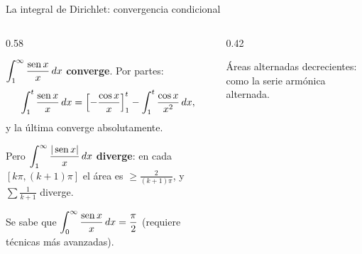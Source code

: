 \documentclass[10pt,aspectratio=169]{beamer}
\begin{document}
\begin{frame}{La integral de Dirichlet: convergencia condicional}
  \begin{columns}
    \begin{column}{0.58\textwidth}
      \begin{ejemplo}[14]
        $\displaystyle\int_1^\infty\frac{\operatorname{sen} x}{x}\,dx$ \textbf{converge}. Por partes:
        \[ \int_1^t\frac{\operatorname{sen} x}{x}\,dx=\left[-\frac{\cos x}{x}\right]_1^t-\int_1^t\frac{\cos x}{x^2}\,dx, \]
        y la última converge absolutamente. \smallskip

        Pero $\displaystyle\int_1^\infty\frac{|\operatorname{sen} x|}{x}\,dx$ \textbf{diverge}: en cada $[k\pi,(k+1)\pi]$ el área es $\ge\frac{2}{(k+1)\pi}$, y
        $\sum\frac1{k+1}$ diverge.
      \end{ejemplo}
      \small Se sabe que $\displaystyle\int_0^\infty\frac{\operatorname{sen} x}{x}\,dx=\frac\pi2$ (requiere técnicas más avanzadas).
    \end{column}
    \begin{column}{0.42\textwidth}
      \centering

      \small Áreas alternadas decrecientes: como la serie armónica alternada.
    \end{column}
  \end{columns}
\end{frame}
\end{document}
